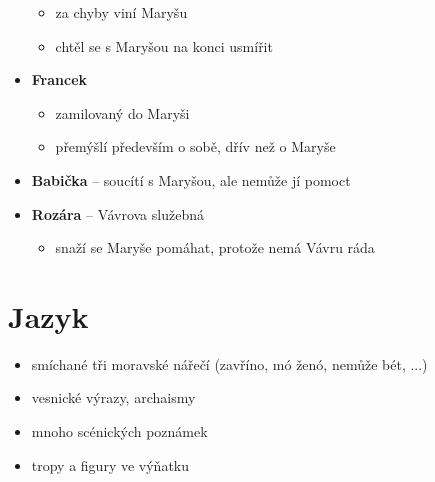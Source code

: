 \documentclass[10pt,a4paper]{article}
\begin{document}
\begin{itemize}
\begin{itemize}
	\item za chyby viní Maryšu
	\item chtěl se s Maryšou na konci usmířit
	\end{itemize}
\item \textbf{Francek}
	\begin{itemize}
	\item zamilovaný do Maryši
	\item přemýšlí především o sobě, dřív než o Maryše
	\end{itemize}
\item \textbf{Babička} -- soucítí s Maryšou, ale nemůže jí pomoct
\item \textbf{Rozára} -- Vávrova služebná
	\begin{itemize}
	\item snaží se Maryše pomáhat, protože nemá Vávru ráda
	\end{itemize}
\end{itemize}
\section*{Jazyk}
\begin{itemize}
\item smíchané tři moravské nářečí (zavříno, mó ženó, nemůže bét, ...)
\item vesnické výrazy, archaismy
\item mnoho scénických poznámek
\item tropy a figury ve výňatku
\end{itemize}
\end{document}
